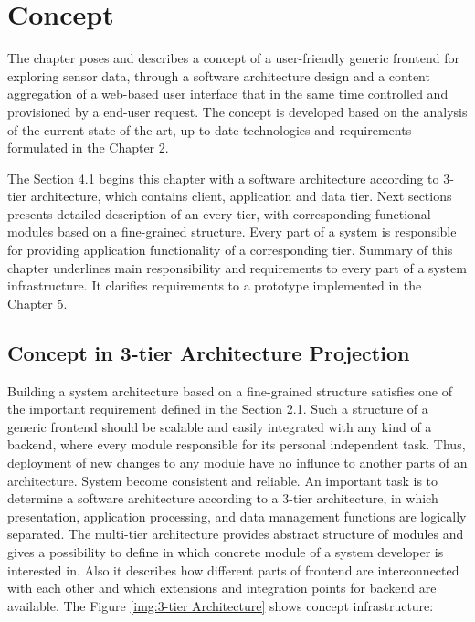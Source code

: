 \chapter{Concept}
     The chapter poses and describes a concept of a user-friendly generic frontend for exploring sensor data, through a software architecture design and a content aggregation of a web-based user interface that in the same time controlled and provisioned by a end-user request. The concept is developed based on the analysis of the current state-of-the-art, up-to-date technologies and requirements formulated in the Chapter 2. 

     The Section 4.1 begins this chapter with a software architecture according to 3-tier architecture, which contains client, application and data tier. Next sections presents detailed description of an every tier, with corresponding functional modules based on a fine-grained structure. Every part of a system is responsible for providing application functionality of a corresponding tier. Summary of this chapter underlines main responsibility and requirements to every part of a system infrastructure. It clarifies requirements to a prototype implemented in the Chapter 5.


\section{Concept in 3-tier Architecture Projection}

  Building a system architecture based on a fine-grained structure satisfies one of the important requirement defined in the Section 2.1. Such a structure of a generic frontend should be scalable and easily integrated with any kind of a backend, where every module responsible for its personal independent task. Thus, deployment of new changes to any module have no influnce to another parts of an architecture. System become consistent and reliable. An important task is to determine a software architecture according to a 3-tier architecture, in which presentation, application processing, and data management functions are logically separated. The multi-tier architecture provides abstract structure of modules and gives a possibility to define in which concrete module of a system developer is interested in. Also it describes how different parts of frontend are interconnected with each other and which extensions and integration points for backend are available.
  \newline
  The Figure \ref{img:3-tier Architecture} shows concept infrastructure:


